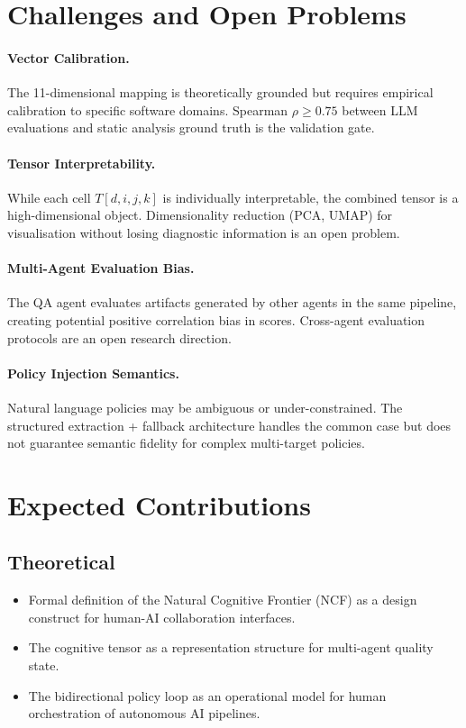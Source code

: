 \documentclass[manuscript,review,anonymous]{acmart}
\begin{document}
\section{Challenges and Open Problems}

\paragraph{Vector Calibration.} The 11-dimensional mapping is theoretically grounded
but requires empirical calibration to specific software domains. Spearman $\rho \geq 0.75$
between LLM evaluations and static analysis ground truth is the validation gate.

\paragraph{Tensor Interpretability.} While each cell $T[d,i,j,k]$ is individually
interpretable, the combined tensor is a high-dimensional object. Dimensionality reduction
(PCA, UMAP) for visualisation without losing diagnostic information is an open problem.

\paragraph{Multi-Agent Evaluation Bias.} The QA agent evaluates artifacts generated by
other agents in the same pipeline, creating potential positive correlation bias in scores.
Cross-agent evaluation protocols are an open research direction.

\paragraph{Policy Injection Semantics.} Natural language policies may be ambiguous or
under-constrained. The structured extraction + fallback architecture handles the common
case but does not guarantee semantic fidelity for complex multi-target policies.

\section{Expected Contributions}

\subsection{Theoretical}

\begin{itemize}
  \item Formal definition of the Natural Cognitive Frontier (NCF) as a design
    construct for human-AI collaboration interfaces.
  \item The cognitive tensor as a representation structure for multi-agent quality state.
  \item The bidirectional policy loop as an operational model for human orchestration
    of autonomous AI pipelines.
\end{itemize}
\end{document}
